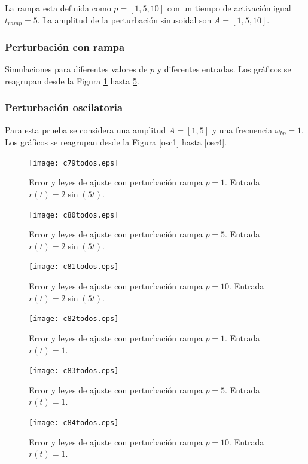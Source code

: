 \documentclass[letterpaper,11pt]{article} %
\begin{document}
La rampa esta definida como $p = [1, 5, 10]$ con un tiempo de activación igual $t_{ramp} = 5$. La amplitud de la perturbación sinusoidal son $A = [1, 5, 10]$.
\subsubsection{Perturbación con rampa}
Simulaciones para diferentes valores de $p$ y diferentes entradas. Los gráficos se reagrupan desde la Figura \ref{rampa1} hasta \ref{rampa6}. 
\subsubsection{Perturbación oscilatoria}
Para esta prueba se considera una amplitud $A=[1, 5]$ y una frecuencia $\omega_{bp} = 1$. Los gráficos se reagrupan desde la Figura \ref{osc1} hasta \ref{osc4}. 
\newpage
\begin{figure}[h]
	\centering
	\captionsetup{justification=centering}
	\texttt{[image: c79todos.eps]}
	\caption{Error y leyes de ajuste con perturbación rampa $p=1$. Entrada $r(t) =  2\sin(5t)$.}
	\label{rampa1}
\end{figure}
\begin{figure}[h]
	\centering
	\captionsetup{justification=centering}
	\texttt{[image: c80todos.eps]}
	\caption{Error y leyes de ajuste con perturbación rampa $p=5$. Entrada $r(t) =  2\sin(5t)$.}
	\label{rampa2}
\end{figure}
\newpage
\begin{figure}[h]
	\centering
	\captionsetup{justification=centering}
	\texttt{[image: c81todos.eps]}
	\caption{Error y leyes de ajuste con perturbación rampa $p=10$. Entrada $r(t) =  2\sin(5t)$.}
	\label{rampa3}
\end{figure}
\begin{figure}[h]
	\centering
	\captionsetup{justification=centering}
	\texttt{[image: c82todos.eps]}
	\caption{Error y leyes de ajuste con perturbación rampa $p=1$. Entrada $r(t) =  1$.}
	\label{rampa5}
\end{figure}
\newpage
\begin{figure}[h]
	\centering
	\captionsetup{justification=centering}
	\texttt{[image: c83todos.eps]}
	\caption{Error y leyes de ajuste con perturbación rampa $p=5$. Entrada $r(t) =  1$.}
	\label{rampa6}
\end{figure}
\begin{figure}[h]
	\centering
	\captionsetup{justification=centering}
	\texttt{[image: c84todos.eps]}
	\caption{Error y leyes de ajuste con perturbación rampa $p=10$. Entrada $r(t) =  1$.}
	\label{rampa4}
\end{figure}
\end{document}
